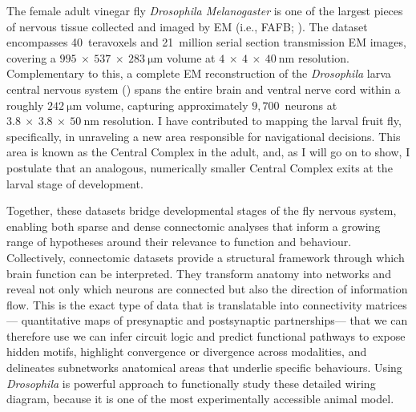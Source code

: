 The female adult vinegar fly \textit{Drosophila Melanogaster} is one of the largest pieces of nervous tissue collected and imaged by EM (i.e., FAFB; \citep{zheng2018complete}). The dataset encompasses 40~teravoxels and 21~million serial section transmission EM images, covering a $995~\times~537~\times~283~\si{\micro\metre}$ volume at $4~\times~4~\times~40~\si{\nano\metre}$ resolution. Complementary to this, a complete EM reconstruction of the \textit{Drosophila} larva central nervous system (\citep{winding2023connectome}) spans the entire brain and ventral nerve cord within a roughly $242~\si{\micro\metre}$ volume, capturing approximately $9{,}700$~neurons at $3.8~\times~3.8~\times~50~\si{\nano\metre}$ resolution. I have contributed to mapping the larval fruit fly, specifically, in unraveling a new area responsible for navigational decisions. This area is known as the Central Complex in the adult, and, as I will go on to show, I postulate that an analogous, numerically smaller Central Complex exits at the larval stage of development. 

Together, these datasets bridge developmental stages of the fly nervous system, enabling both sparse and dense connectomic analyses that inform a growing range of hypotheses around their relevance to function and behaviour. 
Collectively, connectomic datasets provide a structural framework through which brain function can be interpreted. They transform anatomy into networks and reveal not only which neurons are connected but also the direction of information flow. This is the exact type of data that is translatable into connectivity matrices — quantitative maps of presynaptic and postsynaptic partnerships— that we can therefore use we can infer circuit logic and predict functional pathways to expose hidden motifs, highlight convergence or divergence across modalities, and delineates subnetworks anatomical areas that underlie specific behaviours. Using \textit{Drosophila} is powerful approach to functionally study these detailed wiring diagram, because it is one of the most experimentally accessible animal model.  



